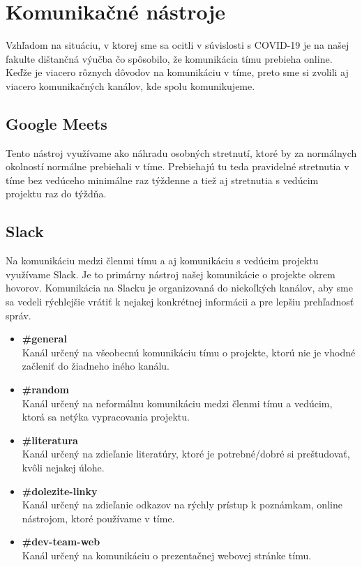 \documentclass{article}
\begin{document}
    

    \section*{Komunikačné nástroje}

        \textnormal{Vzhľadom na situáciu, v ktorej sme sa ocitli v súvislosti s COVID-19 je na našej fakulte dištančná výučba čo spôsobilo, že komunikácia tímu prebieha online. Keďže je viacero rôznych dôvodov na komunikáciu v tíme, preto sme si zvolili aj viacero komunikačných kanálov, kde spolu komunikujeme.}

        \subsection*{Google Meets}

            \textnormal{Tento nástroj využívame ako náhradu osobných stretnutí, ktoré by za normálnych okolností normálne prebiehali v tíme. Prebiehajú tu teda pravidelné stretnutia v tíme bez vedúceho minimálne raz týždenne a tiež aj stretnutia s vedúcim projektu raz do týždňa.}


        \subsection*{Slack}

            \textnormal{Na komunikáciu medzi členmi tímu a aj komunikáciu s vedúcim projektu využívame Slack. Je to primárny nástroj našej komunikácie o projekte okrem hovorov. Komunikácia na Slacku je organizovaná do niekoľkých kanálov, aby sme sa vedeli rýchlejšie vrátiť k nejakej konkrétnej informácii a pre lepšiu prehľadnosť správ.}

            \begin{itemize}
                \item \textbf{\#general} \\
                \textnormal{Kanál určený na všeobecnú komunikáciu tímu o projekte, ktorú nie je vhodné začleniť do žiadneho iného kanálu.}
                \item \textbf{\#random} \\
                \textnormal{Kanál určený na neformálnu komunikáciu medzi členmi tímu a vedúcim, ktorá sa netýka vypracovania projektu.}
                \item \textbf{\#literatura} \\
                \textnormal{Kanál určený na zdieľanie literatúry, ktoré je potrebné/dobré si preštudovať, kvôli nejakej úlohe.}
                \item \textbf{\#dolezite-linky} \\
                \textnormal{Kanál určený na zdieľanie odkazov na rýchly prístup k poznámkam, online nástrojom, ktoré používame v tíme.}
                \item \textbf{\#dev-team-web} \\
                \textnormal{Kanál určený na komunikáciu o prezentačnej webovej stránke tímu.}
            \end{itemize}
\end{document}
